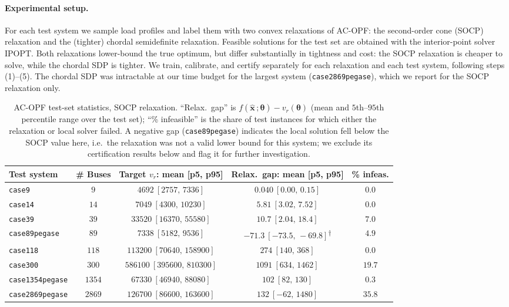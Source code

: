 \documentclass[10pt]{article} %
\theoremstyle{plain}
\theoremstyle{definition}
\theoremstyle{remark}
\begin{document}
\paragraph{Experimental setup.} For each test system we sample load profiles and label them with two convex relaxations of AC-OPF: the second-order cone (SOCP) relaxation and the (tighter) chordal semidefinite relaxation. Feasible solutions for the test set are obtained with the interior-point solver IPOPT. Both relaxations lower-bound the true optimum, but differ substantially in tightness and cost: the SOCP relaxation is cheaper to solve, while the chordal SDP is tighter. We train, calibrate, and certify separately for each relaxation and each test system, following steps (1)--(5). The chordal SDP was intractable at our time budget for the largest system (\texttt{case2869pegase}), which we report for the SOCP relaxation only.

\begin{table}[H]
\centering
\footnotesize
\caption{AC-OPF test-set statistics, SOCP relaxation. ``Relax.\ gap'' is $f(\hat{\mathbf{x}}\,;\bm{\theta}) - v_r(\bm{\theta})$ (mean and $5$th--$95$th percentile range over the test set); ``\% infeasible'' is the share of test instances for which either the relaxation or local solver failed. A negative gap (\texttt{case89pegase}) indicates the local solution fell below the SOCP value here, i.e.\ the relaxation was not a valid lower bound for this system; we exclude its certification results below and flag it for further investigation.}
\begin{tabular}{lcccc}
\toprule
\textbf{Test system} & \textbf{\# Buses} & \textbf{Target } $v_r$\textbf{: mean [p5, p95]} & \textbf{Relax.\ gap: mean [p5, p95]} & \textbf{\% infeas.} \\
\midrule
\texttt{case9}          & $9$    & $4692\ [2757,\,7336]$          & $0.040\ [0.00,\,0.15]$    & $0.0$ \\
\texttt{case14}         & $14$   & $7049\ [4300,\,10230]$         & $5.81\ [3.02,\,7.52]$     & $0.0$ \\
\texttt{case39}         & $39$   & $33520\ [16370,\,55580]$       & $10.7\ [2.04,\,18.4]$     & $7.0$ \\
\texttt{case89pegase}   & $89$   & $7338\ [5182,\,9536]$          & $-71.3\ [-73.5,\,-69.8]$\textsuperscript{$\dagger$} & $4.9$ \\
\texttt{case118}        & $118$  & $113200\ [70640,\,158900]$     & $274\ [140,\,368]$        & $0.0$ \\
\texttt{case300}        & $300$  & $586100\ [395600,\,810300]$    & $1091\ [634,\,1462]$      & $19.7$ \\
\texttt{case1354pegase} & $1354$ & $67330\ [46940,\,88080]$       & $102\ [82,\,130]$         & $0.3$ \\
\texttt{case2869pegase} & $2869$ & $126700\ [86600,\,163600]$     & $132\ [-62,\,1480]$       & $35.8$ \\
\bottomrule
\end{tabular}
\label{tab:ACOPF-data-socp}
\end{table}
\end{document}
